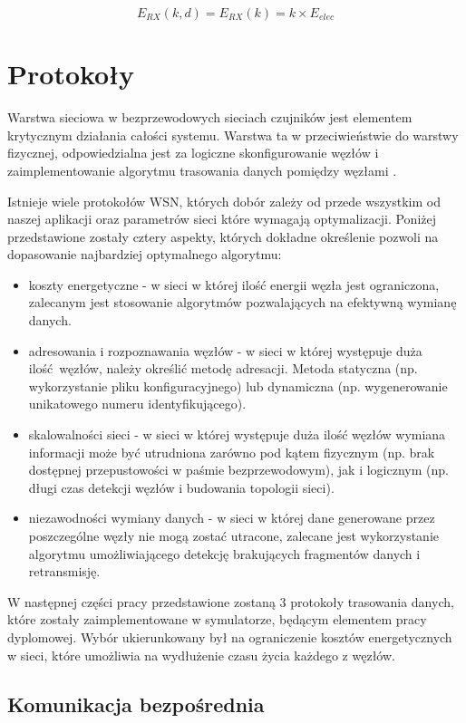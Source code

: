 \documentclass[a4paper,12pt,twoside,openany]{report}
\begin{document}
\[E_{RX}(k,d) = E_{RX}(k) = k \times E_{elec}\]

\section{Protokoły}

Warstwa sieciowa w bezprzewodowych sieciach czujników jest elementem krytycznym działania całości systemu.
Warstwa ta w przeciwieństwie do warstwy fizycznej, odpowiedzialna jest za logiczne skonfigurowanie węzłów i
zaimplementowanie algorytmu trasowania danych pomiędzy węzłami \cite{Akyildiz} \cite{WSN-routing}.

Istnieje wiele protokołów WSN, których dobór zależy od przede wszystkim od naszej aplikacji oraz
parametrów sieci które wymagają optymalizacji. Poniżej przedstawione zostały cztery aspekty, których dokładne określenie pozwoli
na dopasowanie najbardziej optymalnego algorytmu:

\begin{itemize}
 \item koszty energetyczne - w sieci w której ilość energii węzła jest ograniczona, zalecanym jest stosowanie algorytmów pozwalających
       na efektywną wymianę danych.
 \item adresowania i rozpoznawania węzłów - w sieci w której występuje duża ilość węzłów, należy określić metodę adresacji.
       Metoda statyczna (np. wykorzystanie pliku konfiguracyjnego) lub dynamiczna (np. wygenerowanie unikatowego numeru identyfikującego).
 \item skalowalności sieci - w sieci w której występuje duża ilość węzłów wymiana informacji może być utrudniona zarówno pod kątem fizycznym
       (np. brak dostępnej przepustowości w paśmie bezprzewodowym), jak i logicznym (np. długi czas detekcji węzłów i budowania topologii sieci).
 \item niezawodności wymiany danych - w sieci w której dane generowane przez poszczególne węzły nie mogą zostać utracone, zalecane jest wykorzystanie
       algorytmu umożliwiającego detekcję brakujących fragmentów danych i retransmisję.
\end{itemize}

W następnej części pracy przedstawione zostaną 3 protokoły trasowania danych, które zostały zaimplementowane w symulatorze, będącym elementem pracy dyplomowej.
Wybór ukierunkowany był na ograniczenie kosztów energetycznych w sieci, które umożliwia na wydłużenie czasu życia każdego z węzłów.

\subsection{Komunikacja bezpośrednia}
\end{document}
